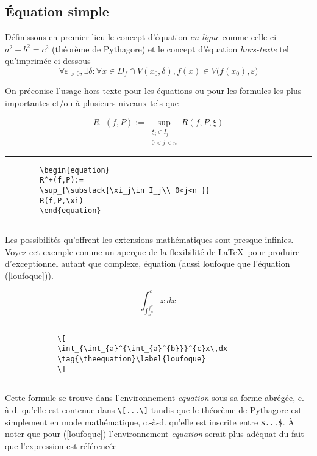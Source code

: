 	\subsection{Équation simple}
	Définissons en premier lieu le concept d'équation \textit{en-ligne} comme celle-ci $a^2+b^2=c^2$ (théorème de Pythagore) et le concept d'équation  \textit{hors-texte}  tel qu'imprimée ci-dessous 
	\[
	\forall\varepsilon_{>0},\exists\delta : \forall x \in D_f \cap V(x_0,\delta), f(x)\in V\big(f(x_0),\varepsilon\big)
	\]
	\par On préconise l'usage hors-texte pour les équations ou pour les formules les plus importantes et/ou à plusieurs niveaux tels que
%
	\begin{table}[H]
		\centering
		\begin{equation}
		R^+(f,P):=\sup_{\substack{\xi_j\in I_j \\
				0<j<n }}
		R(f,P,\xi)\label{darboux}
		\end{equation}	
		\hrule
		\begin{verbatim}
		\begin{equation}
		R^+(f,P):=
		\sup_{\substack{\xi_j\in I_j\\ 0<j<n }}
		R(f,P,\xi)
		\end{equation}
		\end{verbatim}
		\hrule
	\end{table}
%
	\par Les possibilités qu'offrent les extensions mathématiques sont presque infinies. Voyez cet exemple comme un aperçue de la flexibilité de \LaTeX~pour produire d'exceptionnel autant que complexe, équation (aussi loufoque que l'équation (\ref{loufoque})).
%
	\begin{table}[H]
		\setcounter{equation}{2}
		\centering
		\[
		\int_{\int_{a}^{\int_{a}^{b}}}^{c}x\,dx\, 
		\tag{\theequation}\label{loufoque}
		\]
		\hrule
		\begin{verbatim}
			\[
			\int_{\int_{a}^{\int_{a}^{b}}}^{c}x\,dx
			\tag{\theequation}\label{loufoque}
			\]
		\end{verbatim}
		\hrule
	\end{table}
%
	\par Cette formule se trouve dans l'environnement \textit{equation} sous sa forme abrégée, c.-à-d. qu'elle est contenue dans \verb|\[...\]| tandis que le théorème de Pythagore est simplement en mode mathématique, c.-à-d. qu'elle est inscrite entre  \verb|$...$|. À noter que pour (\ref{loufoque}) l'environnement \textit{equation} serait plus adéquat du fait que l'expression est référencée%
